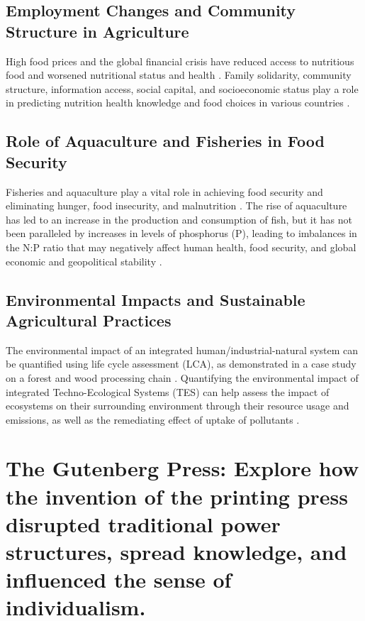 \documentclass{article}
\begin{document}
\subsection{Employment Changes and Community Structure in Agriculture}

High food prices and the global financial crisis have reduced access to nutritious food and worsened nutritional status and health \cite{Brinkman2010HighFP}. Family solidarity, community structure, information access, social capital, and socioeconomic status play a role in predicting nutrition health knowledge and food choices in various countries \cite{Moxley2011TestingTI}. 

\subsection{Role of Aquaculture and Fisheries in Food Security}

Fisheries and aquaculture play a vital role in achieving food security and eliminating hunger, food insecurity, and malnutrition \cite{Gatta2017stateOW}. The rise of aquaculture has led to an increase in the production and consumption of fish, but it has not been paralleled by increases in levels of phosphorus (P), leading to imbalances in the N:P ratio that may negatively affect human health, food security, and global economic and geopolitical stability \cite{Peuelas2020AnthropogenicGS}. 

\subsection{Environmental Impacts and Sustainable Agricultural Practices}

The environmental impact of an integrated human/industrial-natural system can be quantified using life cycle assessment (LCA), as demonstrated in a case study on a forest and wood processing chain \cite{Schaubroeck2013QuantifyingTE}. Quantifying the environmental impact of integrated Techno-Ecological Systems (TES) can help assess the impact of ecosystems on their surrounding environment through their resource usage and emissions, as well as the remediating effect of uptake of pollutants \cite{Schaubroeck2013QuantifyingTE}.


\section{The Gutenberg Press: Explore how the invention of the printing press disrupted traditional power structures, spread knowledge, and influenced the sense of individualism.}
\end{document}
